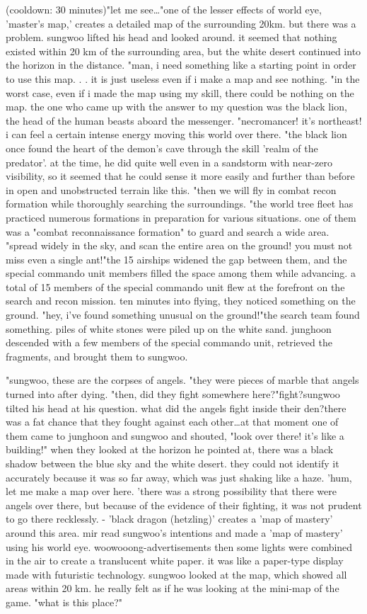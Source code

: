  (cooldown: 30 minutes)"let me see…"one of the lesser effects of world eye, 'master's map,' creates a detailed map of the surrounding 20km.
 but there was a problem.
sungwoo lifted his head and looked around.
 it seemed that nothing existed within 20 km of the surrounding area, but the white desert continued into the horizon in the distance.
"man, i need something like a starting point in order to use this map.
.
.
it is just useless even if i make a map and see nothing.
"in the worst case, even if i made the map using my skill, there could be nothing on the map.
 the one who came up with the answer to my question was the black lion, the head of the human beasts aboard the messenger.
"necromancer! it's northeast! i can feel a certain intense energy moving this world over there.
"the black lion once found the heart of the demon's cave through the skill 'realm of the predator'.
 at the time, he did quite well even in a sandstorm with near-zero visibility, so it seemed that he could sense it more easily and further than before in open and unobstructed terrain like this.
"then we will fly in combat recon formation while thoroughly searching the surroundings.
"the world tree fleet has practiced numerous formations in preparation for various situations.
 one of them was a "combat reconnaissance formation" to guard and search a wide area.
"spread widely in the sky, and scan the entire area on the ground! you must not miss even a single ant!"the 15 airships widened the gap between them, and the special commando unit members filled the space among them while advancing.
 a total of 15 members of the special commando unit flew at the forefront on the search and recon mission.
ten minutes into flying, they noticed something on the ground.
 "hey, i've found something unusual on the ground!"the search team found something.
 piles of white stones were piled up on the white sand.
 junghoon descended with a few members of the special commando unit, retrieved the fragments, and brought them to sungwoo.
 

"sungwoo, these are the corpses of angels.
"they were pieces of marble that angels turned into after dying.
 "then, did they fight somewhere here?"fight?sungwoo tilted his head at his question.
 what did the angels fight inside their den?there was a fat chance that they fought against each other…at that moment one of them came to junghoon and sungwoo and shouted, "look over there! it's like a building!" when they looked at the horizon he pointed at, there was a black shadow between the blue sky and the white desert.
 they could not identify it accurately because it was so far away, which was just shaking like a haze.
'hum, let me make a map over here.
'there was a strong possibility that there were angels over there, but because of the evidence of their fighting, it was not prudent to go there recklessly.
- 'black dragon (hetzling)' creates a 'map of mastery' around this area.
mir read sungwoo's intentions and made a 'map of mastery' using his world eye.
woowooong-advertisements    then some lights were combined in the air to create a translucent white paper.
it was like a paper-type display made with futuristic technology.
sungwoo looked at the map, which showed all areas within 20 km.
he really felt as if he was looking at the mini-map of the game.
"what is this place?"

 